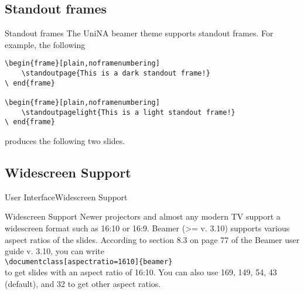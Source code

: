 \documentclass[10pt,aspectratio=43
	]{beamer}
\begin{document}
\subsection{Standout frames}


\begin{frame}[fragile]{Standout frames}{}
	The UniNA beamer theme supports standout frames. For example, the following
	\begin{verbatim}
\begin{frame}[plain,noframenumbering]
	\standoutpage{This is a dark standout frame!}
\ end{frame}

\begin{frame}[plain,noframenumbering]
	\standoutpagelight{This is a light standout frame!}
\ end{frame}
	\end{verbatim}
	produces the following two slides.
\end{frame}

\begin{frame}
\end{frame}

\begin{frame}
\end{frame}

\subsection{Widescreen Support}
\begin{frame}{User Interface}{Widescreen Support}
\begin{block}{Widescreen Support}
	Newer projectors and almost any modern TV support a widescreen format such as 16:10 or 16:9. Beamer (>= v. 3.10) supports various aspect ratios of the slides. According to section 8.3 on page 77 of the Beamer user guide v. 3.10, you can write\\
{\tt\textbackslash documentclass[aspectratio=1610]\{beamer\}}\\
to get slides with an aspect ratio of 16:10. You can also use 169, 149, 54, 43 (default), and 32 to get other aspect ratios.
\end{block}
\end{frame}

\begin{frame}
\end{frame}
\end{document}
